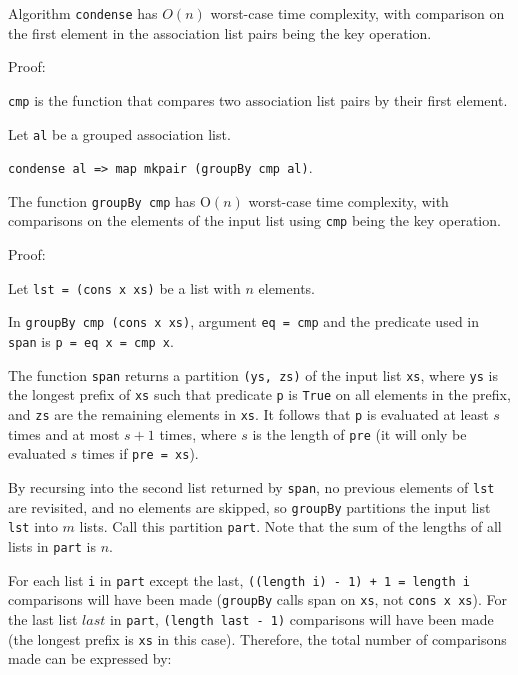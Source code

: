 \documentclass[../main.tex]{subfiles}
\begin{document}
\begin{theorem}
	Algorithm \texttt{condense} has $O(n)$ worst-case time complexity, with comparison on the first element in the association list pairs being the key operation.
\end{theorem}

Proof:

\texttt{cmp} is the function that compares two association list pairs by their first element.  

Let \texttt{al} be a grouped association list.

\texttt{condense al => map mkpair (groupBy cmp al)}.

\begin{proposition}
	The function \texttt{groupBy cmp} has O$(n)$ worst-case time complexity, with comparisons on the elements of the input list using \texttt{cmp} being the key operation.
\end{proposition}

Proof:

Let \texttt{lst = (cons x xs)} be a list with $n$ elements.

In \texttt{groupBy cmp (cons x xs)}, argument \texttt{eq = cmp} and the predicate used in \texttt{span} is \texttt{p = eq x = cmp x}.

The function \texttt{span} returns a partition \texttt{(ys, zs)} of the input list \texttt{xs}, where \texttt{ys} is the longest prefix of \texttt{xs} such that predicate \texttt{p} is \texttt{True} on all elements in the prefix, and \texttt{zs} are the remaining elements in \texttt{xs}.  It follows that \texttt{p} is evaluated at least $s$ times and at most $s + 1$ times, where $s$ is the length of \texttt{pre} (it will only be evaluated $s$ times if \texttt{pre = xs}).

By recursing into the second list returned by \texttt{span}, no previous elements of \texttt{lst} are revisited, and no elements are skipped, so \texttt{groupBy} partitions the input list \texttt{lst} into $m$ lists.  Call this partition \texttt{part}.  Note that the sum of the lengths of all lists in \texttt{part} is $n$.

For each list \texttt{i} in \texttt{part} except the last, \texttt{((length i) - 1) + 1 = length i} comparisons will have been made (\texttt{groupBy} calls span on \texttt{xs}, not \texttt{cons x xs}).  For the last list $last$ in \texttt{part}, \texttt{(length last - 1)} comparisons will have been made (the longest prefix is \texttt{xs} in this case).  Therefore, the total number of comparisons made can be expressed by:
\end{document}
